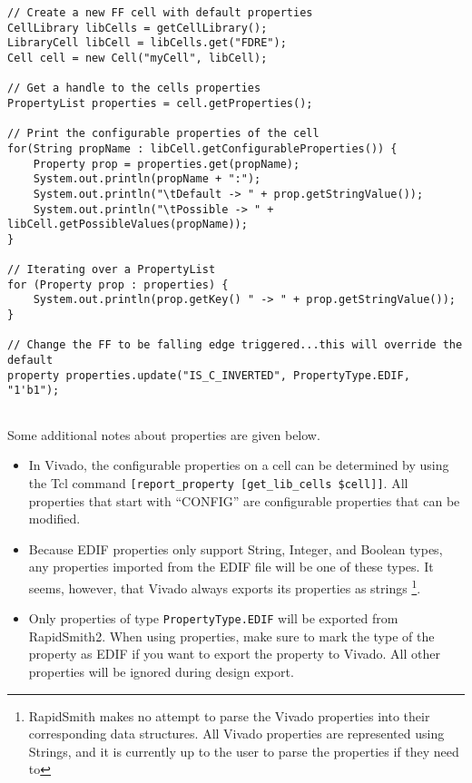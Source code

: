 \begin{lstlisting}[xleftmargin=1.5em, framexleftmargin=1.5em, caption=Using
PropertyLists in RapidSmith, label=code:properties] 
// Create a new FF cell with default properties
CellLibrary libCells = getCellLibrary();
LibraryCell libCell = libCells.get("FDRE");
Cell cell = new Cell("myCell", libCell);

// Get a handle to the cells properties
PropertyList properties = cell.getProperties();

// Print the configurable properties of the cell 
for(String propName : libCell.getConfigurableProperties()) {
	Property prop = properties.get(propName);
	System.out.println(propName + ":");
	System.out.println("\tDefault -> " + prop.getStringValue());
	System.out.println("\tPossible -> " + libCell.getPossibleValues(propName)); 
}

// Iterating over a PropertyList
for (Property prop : properties) {
	System.out.println(prop.getKey() " -> " + prop.getStringValue());
}

// Change the FF to be falling edge triggered...this will override the default
property properties.update("IS_C_INVERTED", PropertyType.EDIF, "1'b1");


\end{lstlisting}

\noindent Some additional notes about properties are given below. 

\begin{itemize}
  \item In Vivado, the configurable properties on a cell can be determined by
  using the Tcl command \texttt{[report\_prope\-rty [get\_lib\_cells \$cell]]}.
  All properties that start with ``CONFIG'' are configurable properties that
  can be modified.
  
  \item Because EDIF properties only support String, Integer, and Boolean types,
  any properties imported from the EDIF file will be one of these types.
  It seems, however, that Vivado always exports its properties as strings
  \footnote{RapidSmith makes no attempt to parse the Vivado properties into
  their corresponding data structures. All Vivado properties are represented using
  Strings, and it is currently up to the user to parse the properties if they
  need to}.
 
  \item Only properties of type \texttt{PropertyType.EDIF} will be exported from
  RapidSmith2. When using properties, make sure to mark the type of the property
  as EDIF if you want to export the property to Vivado. All other properties
  will be ignored during design export.
    
\end{itemize}

